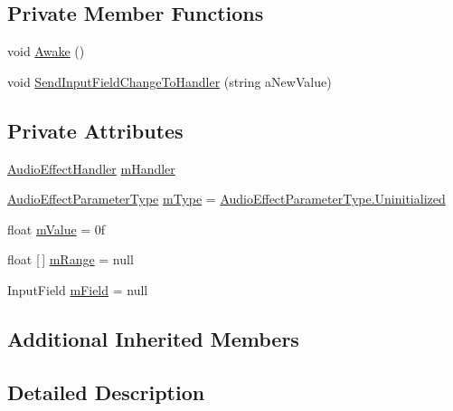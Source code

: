 \subsection*{Private Member Functions}
\begin{DoxyCompactItemize}
\item 
void \hyperlink{class_a_t_i_1_1_audio_effect_parameter_trigger_ae980fd38eb2207caaa9049f2f47b982a}{Awake} ()
\item 
void \hyperlink{class_a_t_i_1_1_audio_effect_parameter_trigger_a3f60059b95efae2e486d505c8a703547}{Send\+Input\+Field\+Change\+To\+Handler} (string a\+New\+Value)
\end{DoxyCompactItemize}
\subsection*{Private Attributes}
\begin{DoxyCompactItemize}
\item 
\hyperlink{class_a_t_i_1_1_audio_effect_handler}{Audio\+Effect\+Handler} \hyperlink{class_a_t_i_1_1_audio_effect_parameter_trigger_adbbf64af845654ab7737b081b232b456}{m\+Handler}
\item 
\hyperlink{class_a_t_i_a1123d61b8dceb5867a3683e8d2224ee1}{Audio\+Effect\+Parameter\+Type} \hyperlink{class_a_t_i_1_1_audio_effect_parameter_trigger_ac2ca110ecb26468c2c9fde094a1e5bd7}{m\+Type} = \hyperlink{class_a_t_i_a1123d61b8dceb5867a3683e8d2224ee1af704f57ea420275ad51bf55b7dec2c96}{Audio\+Effect\+Parameter\+Type.\+Uninitialized}
\item 
float \hyperlink{class_a_t_i_1_1_audio_effect_parameter_trigger_ad123c432e1decb6410707940ab7383e6}{m\+Value} = 0f
\item 
float \mbox{[}$\,$\mbox{]} \hyperlink{class_a_t_i_1_1_audio_effect_parameter_trigger_a5d507ef47c507ce355323ab8a072be7d}{m\+Range} = null
\item 
Input\+Field \hyperlink{class_a_t_i_1_1_audio_effect_parameter_trigger_af2d8e3ab407c8e1eb216fd67976ac0c8}{m\+Field} = null
\end{DoxyCompactItemize}
\subsection*{Additional Inherited Members}


\subsection{Detailed Description}


